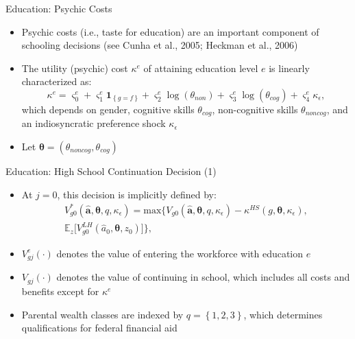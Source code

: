 \documentclass{beamer}
\begin{document}
\begin{frame}{Education: Psychic Costs}
\begin{itemize}
  \item Psychic costs (i.e., taste for education) are an important component of schooling decisions (see 		 Cunha et al., 2005; Heckman et al., 2006)
  \item The utility (psychic) cost $\kappa^{e}$ of attaining education level $e$ is linearly 				characterized as:
 		$$\kappa^{e} = \varsigma^{e}_{0}+\varsigma^{e}_{1}\textbf{1}_{\left\{g=f\right							\}}+\varsigma^{e}_{2}\log{(\theta_{non})}+\varsigma^{e}_{3}\log{(\theta_{cog})}+						\varsigma^{e}_{4}\kappa_{\epsilon},$$
        which depends on gender, cognitive skills $\theta_{cog}$, non-cognitive skills 							$\theta_{noncog}$, and an indiosyncratic preference shock $\kappa_{\epsilon}$
  \item Let $\boldsymbol{\theta}=(\theta_{noncog},\theta_{cog})$
\end{itemize}   
\hyperlink{Psychic Costs}{}
\end{frame}   

\begin{frame}{Education: High School Continuation Decision (1)}
\begin{itemize}
  \item At $j=0$, this decision is implicitly defined by:
  		\begin{equation*}
  		\begin{aligned}
  		V^*_{g0}(\hat{\textbf{a}},\boldsymbol{\theta},q,\kappa_{\epsilon}) = \mathrm{max}\big\{V_{g0}			(\hat{\textbf{a}},\boldsymbol{\theta},q,\kappa_{\epsilon})-\kappa^{HS}(g,\boldsymbol{\theta},			\kappa_{\epsilon}), \\
        \mathbb{E}_{z}\big[V^{LH}_{g0}(\hat{a}_0,\boldsymbol{\theta},z_0)\big]\big\},
        \end{aligned}
        \end{equation*}
  \item $V^{e}_{gj}(\cdot)$ denotes the value of entering the workforce with education $e$
  \item $V_{gj}(\cdot)$ denotes the value of continuing in school, which includes all costs and 				benefits except for $\kappa^{e}$
  \item Parental wealth classes are indexed by $q=\left\{1,2,3\right\}$, which determines 					qualifications for federal financial aid
\end{itemize}      
\end{frame} 
\end{document}
